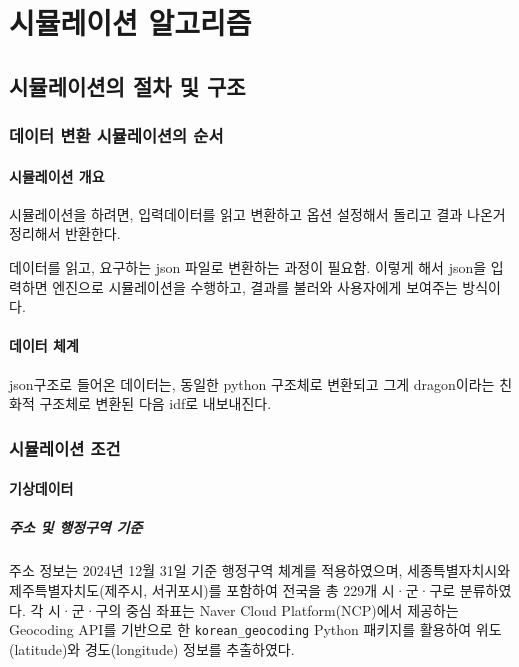 \part{시뮬레이션 알고리즘}
\label{part:algorithm}


\chapter{시뮬레이션의 절차 및 구조}

\section{데이터 변환 시뮬레이션의 순서}

\subsection{시뮬레이션 개요}
시뮬레이션을 하려면, 입력데이터를 읽고 변환하고 옵션 설정해서 \ep 돌리고 결과 나온거 정리해서 반환한다.

데이터를 읽고, 요구하는 json 파일로 변환하는 과정이 필요함. 이렇게 해서 json을 입력하면 \simulator 엔진으로 시뮬레이션을 수행하고, 결과를 불러와 사용자에게 보여주는 방식이다.

\subsection{데이터 체계}
json구조로 들어온 데이터는, 동일한 python 구조체로 변환되고 그게 dragon이라는 \eq 친화적 구조체로 변환된 다음 idf로 내보내진다.


\section{시뮬레이션 조건}
\subsection{기상데이터}
\subsubsection{주소 및 행정구역 기준}
주소 정보는 2024년 12월 31일 기준 행정구역 체계를 적용하였으며, 세종특별자치시와 제주특별자치도(제주시, 서귀포시)를 포함하여 전국을 총 229개 시·군·구로 분류하였다.
각 시·군·구의 중심 좌표는 Naver Cloud Platform(NCP)에서 제공하는 Geocoding API를 기반으로 한 \texttt{korean\_geocoding} Python 패키지를 활용하여 위도(latitude)와 경도(longitude) 정보를 추출하였다.

